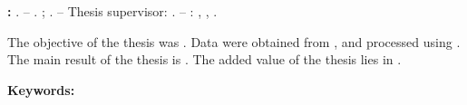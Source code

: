 {}

\vspace{7mm}
\noindent
\textbf{\MakeUppercase{\AuthorName}:} \ThesisTitleEN. -- \UniversityName.
\FacultyName; \DepartmentName. -- Thesis supervisor:
\SupervisorName. -- \PlaceName: \FacultyAbbrev, \SubmissionYear, \PageCount.

\vspace{6mm}
\noindent
The objective of the thesis was \AbstractGoalEN.
Data were obtained from \AbstractDataEN, and processed using
\AbstractMethodEN. The main result of the thesis is \AbstractResultEN.
The added value of the thesis lies in \AbstractValueEN.

\vspace{3mm}
\noindent
\textbf{Keywords:} \KeywordsEN

\clearpage
